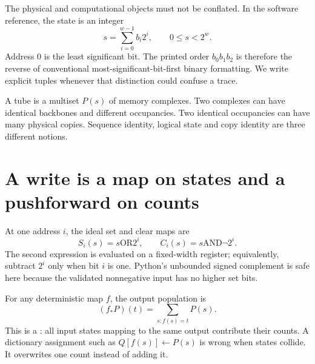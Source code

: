 
The physical and computational objects must not be conflated. In the
software reference, the state is an integer
\begin{equation}
 s=\sum_{i=0}^{w-1}b_i2^i,\qquad 0\leq s<2^w.
 \label{eq:register}
\end{equation}
Address 0 is the least significant bit. The printed order $b_0b_1b_2$
is therefore the reverse of conventional most-significant-bit-first
binary formatting. We write explicit tuples whenever that distinction
could confuse a trace.

A tube is a multiset $P(s)$ of memory complexes. Two complexes can have
identical backbones and different occupancies. Two identical occupancies
can have many physical copies. Sequence identity, logical state and copy
identity are three different notions.

\section{A write is a map on states and a pushforward on counts}
At one address $i$, the ideal set and clear maps are
\begin{equation}
 S_i(s)=s\mathbin{\mathrm{OR}}2^i,\qquad
 C_i(s)=s\mathbin{\mathrm{AND}}\neg 2^i.
 \label{eq:write}
\end{equation}
The second expression is evaluated on a fixed-width register; equivalently,
subtract $2^i$ only when bit $i$ is one. Python's unbounded signed complement
is safe here because the validated nonnegative input has no higher set bits.

For any deterministic map $f$, the output population is
\begin{equation}
 (f_*P)(t)=\sum_{s:f(s)=t}P(s).
 \label{eq:pushforward}
\end{equation}
This is a : all input states mapping to the same output
contribute their counts. A dictionary assignment such as
$Q[f(s)]\leftarrow P(s)$ is wrong when states collide. It overwrites one
count instead of adding it.



